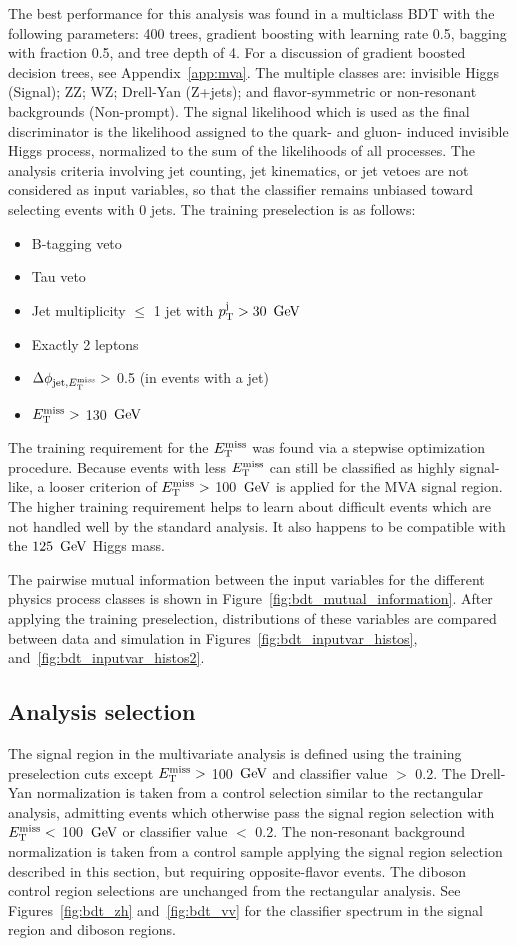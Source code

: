 The best performance for this analysis was found in a multiclass BDT with the following parameters: 400 trees, gradient boosting with learning rate 0.5, bagging with fraction 0.5, and tree depth of 4.
For a discussion of gradient boosted decision trees, see Appendix~\ref{app:mva}.
The multiple classes are: invisible Higgs (Signal); ZZ; WZ; Drell-Yan (Z+jets); and flavor-symmetric or non-resonant backgrounds (Non-prompt).
The signal likelihood which is used as the final discriminator is the likelihood assigned to the quark- and gluon- induced invisible Higgs process, normalized to the sum of the likelihoods of all processes.
The analysis criteria involving jet counting, jet kinematics, or jet vetoes are not considered as input variables, so that the classifier remains unbiased toward selecting events with 0 jets.
The training preselection is as follows:
\begin{itemize}
\item B-tagging veto
\item Tau veto
\item Jet multiplicity $\leq$ 1 jet with $p_{\mathrm{T}}^{\rm j} > 30~\,\text{Ge\hspace{-.08em}V}$
\item Exactly 2 leptons
\item $\Delta \phi_{{\rm jet},E_\mathrm{T}^{\mathrm{miss}}} >$ 0.5 (in events with a jet)
\item $E_\mathrm{T}^{\mathrm{miss}} >$ 130 $\,\text{Ge\hspace{-.08em}V}$
\end{itemize}
The training requirement for the $E_\mathrm{T}^{\mathrm{miss}}$ was found via a stepwise optimization procedure.
Because events with less $E_\mathrm{T}^{\mathrm{miss}}$ can still be classified as highly signal-like,
a looser criterion of $E_\mathrm{T}^{\mathrm{miss}} >$ 100 $\,\text{Ge\hspace{-.08em}V}$ is applied for the MVA signal region.
The higher training requirement helps to learn about difficult events which are not handled well by the standard analysis.
It also happens to be compatible with the $125~\,\text{Ge\hspace{-.08em}V}$ Higgs mass.

The pairwise mutual information between the input variables for the different physics process classes is shown in Figure~\ref{fig:bdt_mutual_information}.
After applying the training preselection, distributions of these variables are compared
between data and simulation in Figures~\ref{fig:bdt_inputvar_histos}, and~\ref{fig:bdt_inputvar_histos2}.

\subsection{Analysis selection} 

The signal region in the multivariate analysis is defined using the training preselection cuts except $E_\mathrm{T}^{\mathrm{miss}} >$ 100 $\,\text{Ge\hspace{-.08em}V}$ and classifier value $>$ 0.2. 
The Drell-Yan normalization is taken from a control selection similar to the rectangular analysis, admitting events which otherwise pass the signal region selection with $E_\mathrm{T}^{\mathrm{miss}} <$ 100 $\,\text{Ge\hspace{-.08em}V}$ or classifier value $<$ 0.2.
The non-resonant background normalization is taken from a control sample applying the signal region selection 
described in this section, but requiring opposite-flavor events. The diboson control region 
selections are unchanged from the rectangular analysis. See Figures~\ref{fig:bdt_zh} 
and~\ref{fig:bdt_vv} for the classifier spectrum in the signal region and diboson regions.

